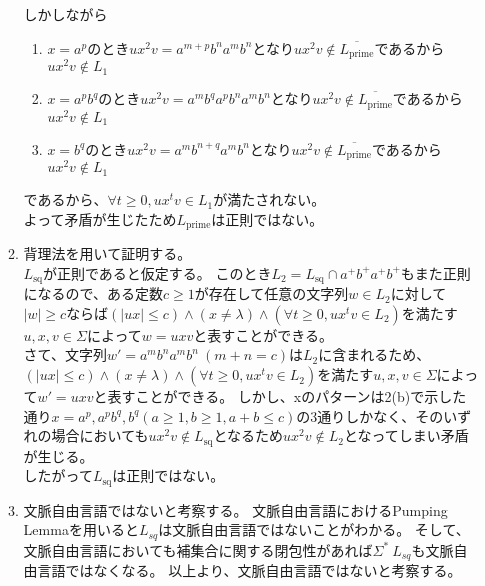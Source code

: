 \documentclass[uplatex,dvipdfmx,a4paper,10pt]{jsarticle}
\begin{document}
\begin{enumerate}
\begin{enumerate}
                    しかしながら
                    \begin{enumerate}
                      \item \(x = a^p\)のとき\(ux^2v = a^{m+p}b^na^mb^n\)となり\(ux^2v \notin \overline{L_\text{prime}}\)であるから\(ux^2v \notin L_1\)
                      \item \(x = a^pb^q\)のとき\(ux^2v = a^mb^qa^pb^na^mb^n\)となり\(ux^2v \notin \overline{L_\text{prime}}\)であるから\(ux^2v \notin L_1\)
                      \item \(x = b^q\)のとき\(ux^2v = a^mb^{n+q}a^mb^n\)となり\(ux^2v \notin \overline{L_\text{prime}}\)であるから\(ux^2v \notin L_1\)
                    \end{enumerate}
                    であるから、\(\forall t \geq 0,ux^tv \in L_1\)が満たされない。 \\
                    \hspace{1em}よって矛盾が生じたため\(L_\text{prime}\)は正則ではない。 \\
              \item \hspace{1em}背理法を用いて証明する。 \\
                    \hspace{1em}\(L_\text{sq}\)が正則であると仮定する。
                    このとき\(L_2 = L_\text{sq} \cap a^{+}b^{+}a^{+}b^{+}\)もまた正則になるので、ある定数\(c \geq 1\)が存在して任意の文字列\(w \in L_2\)に対して\(|w| \geq c\)ならば\((|ux| \leq c) \land (x \neq \lambda) \land (\forall t \geq 0, ux^tv \in L_2)\)を満たす\(u, x, v \in \Sigma\)によって\(w = uxv\)と表すことができる。 \\
                    \hspace{1em}さて、文字列\(w' = a^{m}b^{n}a^{m}b^{n}\ (m + n = c)\)は\(L_2\)に含まれるため、\((|ux| \leq c) \land (x \neq \lambda) \land (\forall t \geq 0, ux^tv \in L_2)\)を満たす\(u, x, v \in \Sigma\)によって\(w' = uxv\)と表すことができる。
                    しかし、xのパターンは2(b)で示した通り\(x = a^p, a^pb^q, b^q (a \geq 1, b \geq 1, a + b \leq c)\)の3通りしかなく、そのいずれの場合においても\(ux^2v \notin L_\text{sq}\)となるため\(ux^2v \notin L_2\)となってしまい矛盾が生じる。 \\
                    \hspace{1em}したがって\(L_\text{sq}\)は正則ではない。 \\
              \item 文脈自由言語ではないと考察する。
                    文脈自由言語におけるPumping Lemmaを用いると\(L_{sq}\)は文脈自由言語ではないことがわかる。
                    そして、文脈自由言語においても補集合に関する閉包性があれば\(\Sigma^{*} \ L_{sq}\)も文脈自由言語ではなくなる。
                    以上より、文脈自由言語ではないと考察する。
            \end{enumerate} 


\end{enumerate}
\end{document}
